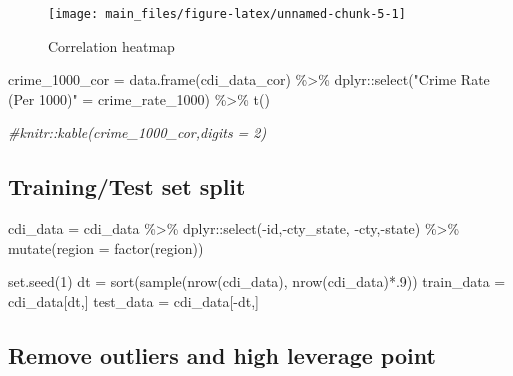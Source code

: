 \documentclass[
  11pt,
]{article}
\newenvironment{Shaded}{\begin{snugshade}}{\end{snugshade}}
\newcommand{\AttributeTok}[1]{\textcolor[rgb]{0.77,0.63,0.00}{#1}}
\newcommand{\CommentTok}[1]{\textcolor[rgb]{0.56,0.35,0.01}{\textit{#1}}}
\newcommand{\DecValTok}[1]{\textcolor[rgb]{0.00,0.00,0.81}{#1}}
\newcommand{\FunctionTok}[1]{\textcolor[rgb]{0.00,0.00,0.00}{#1}}
\newcommand{\NormalTok}[1]{#1}
\newcommand{\OtherTok}[1]{\textcolor[rgb]{0.56,0.35,0.01}{#1}}
\newcommand{\SpecialCharTok}[1]{\textcolor[rgb]{0.00,0.00,0.00}{#1}}
\newcommand{\StringTok}[1]{\textcolor[rgb]{0.31,0.60,0.02}{#1}}
\begin{document}
\begin{figure}
\texttt{[image: main\_files/figure-latex/unnamed-chunk-5-1]} \caption{\label{fig:figs}Correlation heatmap}\label{fig:unnamed-chunk-5}
\end{figure}

\begin{Shaded}
\begin{Highlighting}[]
\NormalTok{crime\_1000\_cor }\OtherTok{=} \FunctionTok{data.frame}\NormalTok{(cdi\_data\_cor) }\SpecialCharTok{\%\textgreater{}\%} 
\NormalTok{  dplyr}\SpecialCharTok{::}\FunctionTok{select}\NormalTok{(}\StringTok{"Crime Rate (Per 1000)"} \OtherTok{=}\NormalTok{ crime\_rate\_1000) }\SpecialCharTok{\%\textgreater{}\%} 
  \FunctionTok{t}\NormalTok{()}

\CommentTok{\#knitr::kable(crime\_1000\_cor,digits = 2) }
\end{Highlighting}
\end{Shaded}

\hypertarget{trainingtest-set-split}{%
\subsection{Training/Test set split}\label{trainingtest-set-split}}

\begin{Shaded}
\begin{Highlighting}[]
\NormalTok{cdi\_data }\OtherTok{=}\NormalTok{ cdi\_data }\SpecialCharTok{\%\textgreater{}\%} 
\NormalTok{  dplyr}\SpecialCharTok{::}\FunctionTok{select}\NormalTok{(}\SpecialCharTok{{-}}\NormalTok{id,}\SpecialCharTok{{-}}\NormalTok{cty\_state, }\SpecialCharTok{{-}}\NormalTok{cty,}\SpecialCharTok{{-}}\NormalTok{state) }\SpecialCharTok{\%\textgreater{}\%} 
  \FunctionTok{mutate}\NormalTok{(}\AttributeTok{region =} \FunctionTok{factor}\NormalTok{(region))}

\FunctionTok{set.seed}\NormalTok{(}\DecValTok{1}\NormalTok{)}
\NormalTok{dt }\OtherTok{=} \FunctionTok{sort}\NormalTok{(}\FunctionTok{sample}\NormalTok{(}\FunctionTok{nrow}\NormalTok{(cdi\_data), }\FunctionTok{nrow}\NormalTok{(cdi\_data)}\SpecialCharTok{*}\NormalTok{.}\DecValTok{9}\NormalTok{))}
\NormalTok{train\_data }\OtherTok{=}\NormalTok{ cdi\_data[dt,]}
\NormalTok{test\_data }\OtherTok{=}\NormalTok{ cdi\_data[}\SpecialCharTok{{-}}\NormalTok{dt,]}
\end{Highlighting}
\end{Shaded}

\hypertarget{remove-outliers-and-high-leverage-point}{%
\subsection{Remove outliers and high leverage
point}\label{remove-outliers-and-high-leverage-point}}
\end{document}

